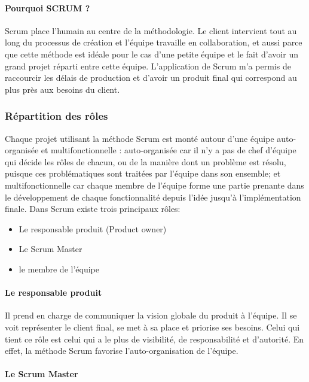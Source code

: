 

\paragraph{Pourquoi SCRUM ?}

Scrum place l’humain au centre de la méthodologie. Le client intervient tout au long
du processus de création et l’équipe travaille en collaboration, et aussi parce que cette
méthode est idéale pour le cas d’une petite équipe et le fait d’avoir un grand projet réparti
entre cette équipe.
L’application de Scrum m’a permis de raccourcir les délais de production et d’avoir
un produit final qui correspond au plus près aux besoins du client.

\subsubsection{Répartition des rôles}

Chaque projet utilisant la méthode Scrum est monté autour d’une équipe auto-
organisée et multifonctionnelle : auto-organisée car il n’y a pas de chef d’équipe qui
décide les rôles de chacun, ou de la manière dont un problème est résolu, puisque ces
problématiques sont traitées par l’équipe dans son ensemble; et multifonctionnelle car
chaque membre de l’équipe forme une partie prenante dans le développement de
chaque fonctionnalité depuis l’idée jusqu’à l’implémentation finale.
Dans Scrum existe trois principaux rôles:
\begin{itemize}
 \item Le responsable produit (Product owner)
 \item Le Scrum Master
 \item le membre de l’équipe
\end{itemize}

\paragraph{Le responsable produit}

Il prend en charge de communiquer la
vision globale du produit à l’équipe. 
Il se voit représenter le client final, se met à sa place
et priorise ses besoins. Celui qui tient ce rôle est celui qui 
a le plus de visibilité, de responsabilité et d’autorité.
En effet, la méthode Scrum favorise l’auto-organisation de l'équipe.

\paragraph{Le Scrum Master}

